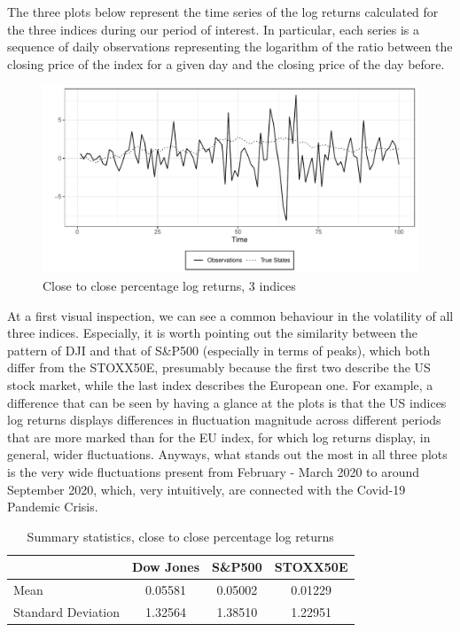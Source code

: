 \documentclass[
]{book}
\theoremstyle{break}
\theoremstyle{nonumberplain}
\begin{document}
The three plots below represent the time series of the log returns
calculated for the three indices during our period of interest. In
particular, each series is a sequence of daily observations representing
the logarithm of the ratio between the closing price of the index for a
given day and the closing price of the day before.

\begin{figure}[H]

{\centering \includegraphics{prova_knit_finale_files/figure-latex/unnamed-chunk-32-1} 

}

\caption{Close to close percentage log returns, 3 indices}\label{fig:unnamed-chunk-32}
\end{figure}

At a first visual inspection, we can see a common behaviour in the
volatility of all three indices. Especially, it is worth pointing out
the similarity between the pattern of DJI and that of S\&P500
(especially in terms of peaks), which both differ from the STOXX50E,
presumably because the first two describe the US stock market, while the
last index describes the European one. For example, a difference that
can be seen by having a glance at the plots is that the US indices log
returns displays differences in fluctuation magnitude across different
periods that are more marked than for the EU index, for which log
returns display, in general, wider fluctuations. Anyways, what stands
out the most in all three plots is the very wide fluctuations present
from February - March 2020 to around September 2020, which, very
intuitively, are connected with the Covid-19 Pandemic Crisis.

\begin{longtable}[t]{lccc}
\caption{\label{tab:unnamed-chunk-33}Summary statistics, close to close percentage log returns}\\
\toprule
  & Dow Jones & S\&P500 & STOXX50E\\
\midrule
Mean & 0.05581 & 0.05002 & 0.01229\\
Standard Deviation & 1.32564 & 1.38510 & 1.22951\\
\bottomrule
\end{longtable}
\end{document}
